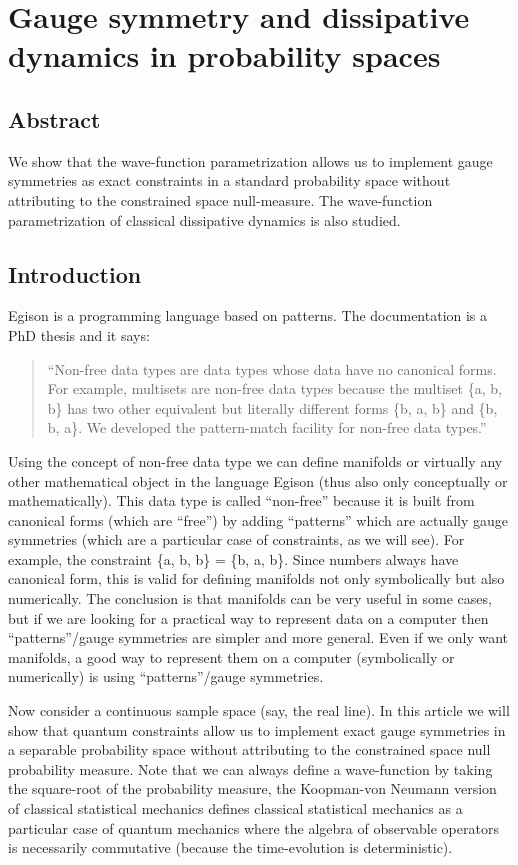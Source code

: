 \documentclass[11pt]{book}
\begin{document}
\chapter{Gauge symmetry and dissipative dynamics in probability spaces}
\section*{Abstract}
We show that the wave-function parametrization allows us to implement
gauge symmetries as exact constraints in a standard probability space
without attributing to the constrained space null-measure. The
wave-function parametrization of classical dissipative dynamics is also
studied.


\hypertarget{introduction}{%
\section{Introduction}\label{introduction}}

Egison is a programming language based on patterns. The
documentation\cite{egison2021thesis} is a
PhD thesis and it says:

\begin{quote}
``Non-free data types are data types whose data have no canonical forms.
For example, multisets are non-free data types because the multiset \{a,
b, b\} has two other equivalent but literally different forms \{b, a,
b\} and \{b, b, a\}. We developed the pattern-match facility for
non-free data types.''
\end{quote}

Using the concept of non-free data type we can define manifolds or
virtually any other mathematical object in the language Egison (thus
also only conceptually or mathematically). This data type is called
``non-free'' because it is built from canonical forms (which are
``free'') by adding ``patterns'' which are actually gauge symmetries
(which are a particular case of constraints, as we will see). For
example, the constraint \{a, b, b\} = \{b, a, b\}. Since numbers always
have canonical form, this is valid for defining manifolds not only
symbolically but also numerically. The conclusion is that manifolds can
be very useful in some cases, but if we are looking for a practical way
to represent data on a computer then ``patterns''/gauge symmetries are
simpler and more general. Even if we only want manifolds, a good way to
represent them on a computer (symbolically or numerically) is using
``patterns''/gauge symmetries.

Now consider a continuous sample space (say, the real line). In this
article we will show that quantum constraints allow us to implement
exact gauge symmetries in a separable probability space without
attributing to the constrained space null probability measure. Note that
we can always define a wave-function by taking the square-root of the
probability measure, the Koopman-von Neumann version of classical
statistical
mechanics\cite{Sudarshan1976Interaction}\cite{PhysRevResearch.2.043102}\cite{article}\cite{BEVANDA2021197}
defines classical statistical mechanics as a particular case of quantum
mechanics where the algebra of observable operators is necessarily
commutative (because the time-evolution is deterministic).
\end{document}

